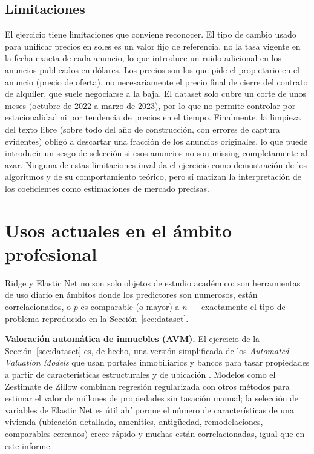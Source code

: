 \documentclass[11pt,a4paper]{article}
\theoremstyle{simple}
\begin{document}
\subsection{Limitaciones}
El ejercicio tiene limitaciones que conviene reconocer. El tipo de cambio usado para unificar precios en soles es un valor fijo de referencia, no la tasa vigente en la fecha exacta de cada anuncio, lo que introduce un ruido adicional en los anuncios publicados en dólares. Los precios son los que pide el propietario en el anuncio (precio de oferta), no necesariamente el precio final de cierre del contrato de alquiler, que suele negociarse a la baja. El dataset solo cubre un corte de unos meses (octubre de 2022 a marzo de 2023), por lo que no permite controlar por estacionalidad ni por tendencia de precios en el tiempo. Finalmente, la limpieza del texto libre (sobre todo del año de construcción, con errores de captura evidentes) obligó a descartar una fracción de los anuncios originales, lo que puede introducir un sesgo de selección si esos anuncios no son missing completamente al azar. Ninguna de estas limitaciones invalida el ejercicio como demostración de los algoritmos y de su comportamiento teórico, pero sí matizan la interpretación de los coeficientes como estimaciones de mercado precisas.

\section{Usos actuales en el ámbito profesional}\label{sec:usos}
Ridge y Elastic Net no son solo objetos de estudio académico: son herramientas de uso diario en ámbitos donde los predictores son numerosos, están correlacionados, o $p$ es comparable (o mayor) a $n$ --- exactamente el tipo de problema reproducido en la Sección~\ref{sec:dataset}.

\textbf{Valoración automática de inmuebles (AVM).} El ejercicio de la Sección~\ref{sec:dataset} es, de hecho, una versión simplificada de los \emph{Automated Valuation Models} que usan portales inmobiliarios y bancos para tasar propiedades a partir de características estructurales y de ubicación \cite{pace2008}. Modelos como el Zestimate de Zillow combinan regresión regularizada con otros métodos para estimar el valor de millones de propiedades sin tasación manual; la selección de variables de Elastic Net es útil ahí porque el número de características de una vivienda (ubicación detallada, amenities, antigüedad, remodelaciones, comparables cercanos) crece rápido y muchas están correlacionadas, igual que en este informe.
\end{document}
